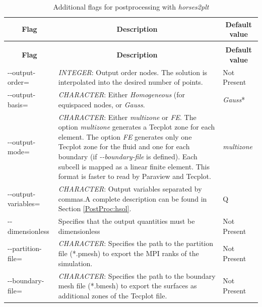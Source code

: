 \documentclass[a4paper,10pt]{report}
\begin{document}
\begin{longtable}{|p{4cm}|p{10cm}|p{2.2cm}|}
\caption{Flags for \textit{horses2plt}.} \label{tab:Postprocessing} \\
\hline
\multicolumn{1}{|c|}{\textbf{Flag}} & \multicolumn{1}{c|}{\textbf{Description}} & \multicolumn{1}{c|}{\textbf{Default value}} \\ \hline
\endfirsthead

\caption{Additional flags for postprocessing with \textit{horses2plt}} \\
\hline
\multicolumn{1}{|c|}{\textbf{Flag}} & \multicolumn{1}{c|}{\textbf{Description}} & \multicolumn{1}{c|}{\textbf{Default value}} \\ \hline
\endhead

-{}-output-order= 	& 
			\textit{INTEGER}: Output order nodes. The solution is interpolated into the desired number of points. & 
							Not Present \\ \hline
							
-{}-output-basis= 	& 
			\textit{CHARACTER}: Either \textit{Homogeneous} (for equispaced nodes, or \textit{Gauss}.  & 
							\textit{Gauss}* \\ \hline
							
-{}-output-mode= 	& 
			\textit{CHARACTER}: Either \textit{multizone} or \textit{FE}. The option \textit{multizone} generates a Tecplot zone for each element. The option \textit{FE} generates only one Tecplot zone for the fluid and one for each boundary (if \textit{-{}-boundary-file} is defined).
			Each subcell is mapped as a linear finite element. This format is faster to read by Paraview and Tecplot.  & 
							\textit{multizone} \\ \hline
							
-{}-output-variables= 	& 
			\textit{CHARACTER}: Output variables separated by commas.A complete description can be found in Section \ref{PostProc:hsol}. & 
							Q \\ \hline

-{}-dimensionless 	& 
			Specifies that the output quantities must be dimensionless & 
							Not Present  \\ \hline
							
-{}-partition-file= 	& 
			\textit{CHARACTER}: Specifies the path to the partition file (*.pmesh) to export the MPI ranks of the simulation. & 
							Not Present  \\ \hline
							
-{}-boundary-file= 	&
			\textit{CHARACTER}: Specifies the path to the boundary mesh file (*.bmesh) to export the surfaces as additional zones of the Tecplot file. &
							Not Present  \\ \hline


\end{longtable}
\end{document}
